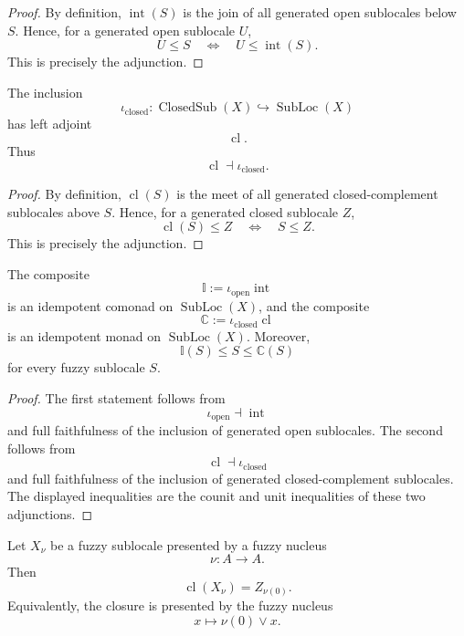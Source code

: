 \begin{proof}
By definition, \(\operatorname{int}(S)\) is the join of all generated open
sublocales below \(S\).  Hence, for a generated open sublocale \(U\),
\[
    U\leq S
    \quad\Longleftrightarrow\quad
    U\leq\operatorname{int}(S).
\]
This is precisely the adjunction.
\end{proof}

\begin{proposition}
\label{prop:fuzzy-closure-adjunction}
The inclusion
\[
    \iota_{\mathrm{closed}}:
    \operatorname{ClosedSub}(X)
    \hookrightarrow
    \operatorname{SubLoc}(X)
\]
has left adjoint
\[
    \operatorname{cl}.
\]
Thus
\[
    \operatorname{cl}\dashv\iota_{\mathrm{closed}}.
\]
\end{proposition}

\begin{proof}
By definition, \(\operatorname{cl}(S)\) is the meet of all generated
closed-complement sublocales above \(S\).  Hence, for a generated closed
sublocale \(Z\),
\[
    \operatorname{cl}(S)\leq Z
    \quad\Longleftrightarrow\quad
    S\leq Z.
\]
This is precisely the adjunction.
\end{proof}

\begin{corollary}
\label{cor:fuzzy-interior-comonad-closure-monad}
The composite
\[
    \mathbb I:=\iota_{\mathrm{open}}\operatorname{int}
\]
is an idempotent comonad on \(\operatorname{SubLoc}(X)\), and the composite
\[
    \mathbb C:=\iota_{\mathrm{closed}}\operatorname{cl}
\]
is an idempotent monad on \(\operatorname{SubLoc}(X)\).  Moreover,
\[
    \mathbb I(S)\leq S\leq\mathbb C(S)
\]
for every fuzzy sublocale \(S\).
\end{corollary}

\begin{proof}
The first statement follows from
\[
    \iota_{\mathrm{open}}\dashv\operatorname{int}
\]
and full faithfulness of the inclusion of generated open sublocales.  The
second follows from
\[
    \operatorname{cl}\dashv\iota_{\mathrm{closed}}
\]
and full faithfulness of the inclusion of generated closed-complement
sublocales.  The displayed inequalities are the counit and unit inequalities of
these two adjunctions.
\end{proof}

\begin{theorem}
\label{thm:posetal-closure-formula}
Let \(X_\nu\) be a fuzzy sublocale presented by a fuzzy nucleus
\[
    \nu:A\to A.
\]
Then
\[
    \operatorname{cl}(X_\nu)=Z_{\nu(0)}.
\]
Equivalently, the closure is presented by the fuzzy nucleus
\[
    x\longmapsto\nu(0)\vee x.
\]
\end{theorem}

